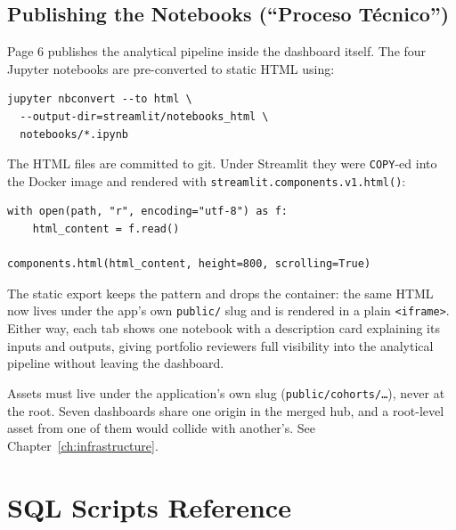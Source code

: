 \subsection{Publishing the Notebooks (``Proceso Técnico'')}

Page 6 publishes the analytical pipeline inside the dashboard itself. The four
Jupyter notebooks are pre-converted to static HTML using:

\begin{lstlisting}[style=dockerfile, caption={Notebook export command}]
jupyter nbconvert --to html \
  --output-dir=streamlit/notebooks_html \
  notebooks/*.ipynb
\end{lstlisting}

The HTML files are committed to git. Under Streamlit they were
\texttt{COPY}-ed into the Docker image and rendered with
\texttt{streamlit.components.v1.html()}:

\begin{lstlisting}[style=python, caption={Notebook rendering in \filepath{streamlit/pages/6\_proceso\_tecnico.py}, lines~113--116}]
with open(path, "r", encoding="utf-8") as f:
    html_content = f.read()

components.html(html_content, height=800, scrolling=True)
\end{lstlisting}

The static export keeps the pattern and drops the container: the same HTML now
lives under the app's own \texttt{public/} slug and is rendered in a plain
\texttt{<iframe>}. Either way, each tab shows one notebook with a description
card explaining its inputs and outputs, giving portfolio reviewers full
visibility into the analytical pipeline without leaving the dashboard.

\begin{keyinsight}
Assets must live under the application's own slug
(\texttt{public/cohorts/\ldots}), never at the root. Seven dashboards share one
origin in the merged hub, and a root-level asset from one of them would collide
with another's. See Chapter~\ref{ch:infrastructure}.
\end{keyinsight}

\section{SQL Scripts Reference}
\label{sec:ecom-sql}

